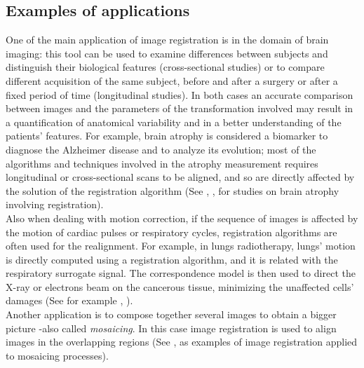 \subsection{Examples of applications}
One of the main application of image registration is in the domain of brain imaging: this tool can be used to examine differences between subjects and distinguish their biological features (cross-sectional studies) or to compare different acquisition of the same subject, before and after a surgery or after a fixed period of time (longitudinal studies). 
In both cases an accurate comparison between images and the parameters of the transformation involved may result in a quantification of anatomical variability and in a better understanding of the patients' features. 
%
For example, brain atrophy is considered a biomarker to diagnose the Alzheimer disease and to analyze its evolution; most of the algorithms and techniques involved in the atrophy measurement requires longitudinal or cross-sectional scans to be aligned, and so are directly affected by the solution of the registration algorithm (See \cite{fox1997brain}, \cite{gauthier2012prevention}, \cite{prados2015measuring} for studies on brain atrophy involving registration). \\
Also when dealing with motion correction, if the sequence of images is affected by the motion of cardiac pulses or respiratory cycles, registration algorithms are often used for the realignment. 
For example, in lungs radiotherapy, lungs' motion is directly computed using a registration algorithm, and it is related with the respiratory surrogate signal. The correspondence model is then used to direct the X-ray or electrons beam on the cancerous tissue, minimizing the unaffected cells' damages (See for example \cite{mcclelland}, \cite{mcclelland2011inter}).\\
Another application is to compose together several images to obtain a bigger picture -also called \emph{mosaicing}. In this case image registration is used to align images in the overlapping regions (See \cite{vercauteren2006robust}, \cite{szeliski1994image} as examples of image registration applied to mosaicing processes).

